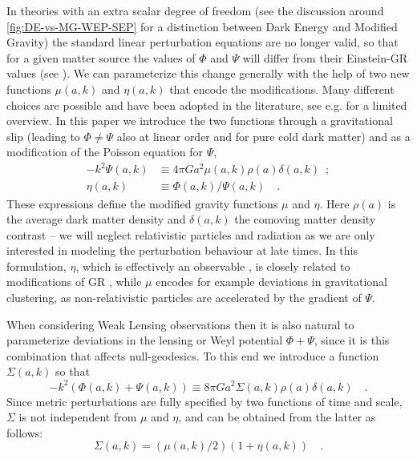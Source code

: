 
In theories with an extra scalar degree of freedom (see the discussion around \cref{fig:DE-vs-MG-WEP-SEP} for a distinction between Dark Energy and Modified Gravity)
the standard linear perturbation equations
are no longer valid, so that for a given matter source the values
of $\Phi$ and $\Psi$ will differ from their Einstein-GR values (see \cite{kunz_phenomenological_2012, amendola_observables_2013}). We can
parameterize this change generally with the help of two new functions $\mu(a,k)$ and $\eta(a,k)$
that encode the modifications. Many different choices are possible
and have been adopted in the literature, see e.g. \cite{planck_collaboration_planck_2016} for a limited overview. 
In this paper
we introduce the two functions through a gravitational slip (leading
to $\Phi\neq\Psi$ also at linear order and for pure cold dark matter)
and as a modification of the Poisson equation for $\Psi$, 
\begin{align}
-k^{2}\Psi(a,k) & \equiv  4\pi
Ga^{2}\mu(a,k)\rho(a)\delta(a,k)\,\,\,;\label{eq:mu_def}\\
\eta(a,k) & \equiv \Phi(a,k)/\Psi(a,k) \quad \label{eq:eta_def}.
\end{align}
These expressions define the modified gravity functions
$\mu$ and $\eta$. Here $\rho(a)$ is the average dark matter density and $\delta(a,k)$
the comoving matter density contrast -- we will neglect relativistic
particles and radiation as we are only interested in modeling the
perturbation behaviour at late times. 
In this formulation, $\eta$,
which is effectively an observable \cite{amendola_observables_2013}, is closely related to
modifications of GR \cite{saltas_anisotropic_2014,sawicki_non-standard_2016}, 
while $\mu$ encodes for example deviations in
gravitational clustering, as non-relativistic particles are accelerated by the gradient of $\Psi$.

When considering Weak Lensing observations then it is also natural
to parameterize deviations in the lensing or Weyl potential $\Phi+\Psi$,
since it is this combination that affects null-geodesics.
To this end we introduce a function $\Sigma(a,k)$ so that
\begin{equation}\label{eq:Sigma-def}
-k^{2}(\Phi(a,k)+\Psi(a,k))\equiv8\pi
Ga^{2}\Sigma(a,k)\rho(a)\delta(a,k) \quad .
\end{equation}
Since metric perturbations are fully specified by two functions of
time and scale, $\Sigma$ is not independent from $\mu$ and $\eta$,
and can be obtained from the latter as follows: 
\begin{equation}\label{eq:SigmaofMuEta}
\Sigma(a,k)=(\mu(a,k)/2)(1+\eta(a,k)) \quad.
\end{equation}


